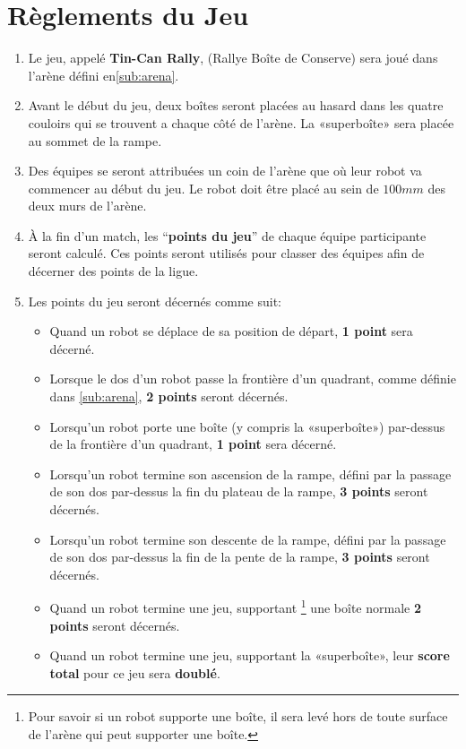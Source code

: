 \section {Règlements du Jeu}
\label{game-rules}

\begin{enumerate}
\item Le jeu, appelé \textbf{Tin-Can Rally}, (Rallye Boîte de Conserve) sera joué dans l'arène défini en\autoref{sub:arena}.
\item Avant le début du jeu, deux boîtes seront placées au hasard dans les quatre couloirs qui se trouvent a chaque côté de l'arène. La «superboîte» sera placée au sommet de la rampe.
\item Des équipes se seront attribuées un coin de l'arène que où leur robot va commencer au début du jeu.
Le robot doit être placé au sein de $100mm$ des deux murs de l'arène.
\item À la fin d'un match, les ``\textbf{points du jeu}'' de chaque équipe participante seront calculé.
 Ces points seront utilisés pour classer des équipes afin de décerner des points de la ligue.

\item Les points du jeu seront décernés comme suit:

\begin{itemize}
\item Quand un robot se déplace de sa position de départ, \textbf{1 point} sera décerné.
\item Lorsque le dos d'un robot passe la frontière d'un quadrant, comme définie dans \autoref{sub:arena}, \textbf{2 points} seront décernés.
\item Lorsqu'un robot porte une boîte (y compris la «superboîte») par-dessus de la frontière d'un quadrant, \textbf{1 point} sera décerné.
\item Lorsqu'un robot termine son ascension de la rampe, défini par la passage de son dos par-dessus la fin du plateau de la rampe, \textbf{3 points} seront décernés.
\item Lorsqu'un robot termine son descente de la rampe, défini par la passage de son dos par-dessus la fin de la pente de la rampe, \textbf{3 points} seront décernés.
\item Quand un robot termine une jeu, supportant \footnote{Pour savoir si un robot supporte une boîte, il sera levé hors de toute surface de l'arène qui peut supporter une boîte.} une boîte normale \textbf{2 points} seront décernés.
\item Quand un robot termine une jeu, supportant la «superboîte», leur \textbf{score total} pour ce jeu sera \textbf{doublé}.
\end{itemize}


\end{enumerate}

